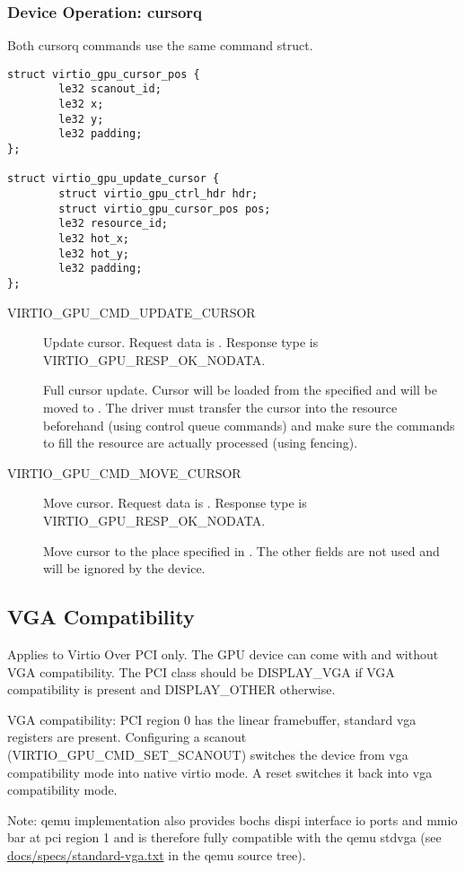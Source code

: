 \subsubsection{Device Operation: cursorq}\label{sec:Device Types / GPU Device / Device Operation / Device Operation: cursorq}

Both cursorq commands use the same command struct.

\begin{lstlisting}
struct virtio_gpu_cursor_pos {
        le32 scanout_id;
        le32 x;
        le32 y;
        le32 padding;
};

struct virtio_gpu_update_cursor {
        struct virtio_gpu_ctrl_hdr hdr;
        struct virtio_gpu_cursor_pos pos;
        le32 resource_id;
        le32 hot_x;
        le32 hot_y;
        le32 padding;
};
\end{lstlisting}

\begin{description}

\item[VIRTIO_GPU_CMD_UPDATE_CURSOR]
Update cursor.
Request data is .
Response type is VIRTIO_GPU_RESP_OK_NODATA.

Full cursor update.  Cursor will be loaded from the specified
 and will be moved to .  The driver must
transfer the cursor into the resource beforehand (using control queue
commands) and make sure the commands to fill the resource are actually
processed (using fencing).

\item[VIRTIO_GPU_CMD_MOVE_CURSOR]
Move cursor.
Request data is .
Response type is VIRTIO_GPU_RESP_OK_NODATA.

Move cursor to the place specified in .  The other fields
are not used and will be ignored by the device.

\end{description}

\subsection{VGA Compatibility}\label{sec:Device Types / GPU Device / VGA Compatibility}

Applies to Virtio Over PCI only.  The GPU device can come with and
without VGA compatibility.  The PCI class should be DISPLAY_VGA if VGA
compatibility is present and DISPLAY_OTHER otherwise.

VGA compatibility: PCI region 0 has the linear framebuffer, standard
vga registers are present.  Configuring a scanout
(VIRTIO_GPU_CMD_SET_SCANOUT) switches the device from vga
compatibility mode into native virtio mode.  A reset switches it back
into vga compatibility mode.

Note: qemu implementation also provides bochs dispi interface io ports
and mmio bar at pci region 1 and is therefore fully compatible with
the qemu stdvga (see \href{https://git.qemu-project.org/?p=qemu.git;a=blob;f=docs/specs/standard-vga.txt;hb=HEAD}{docs/specs/standard-vga.txt} in the qemu source tree).
